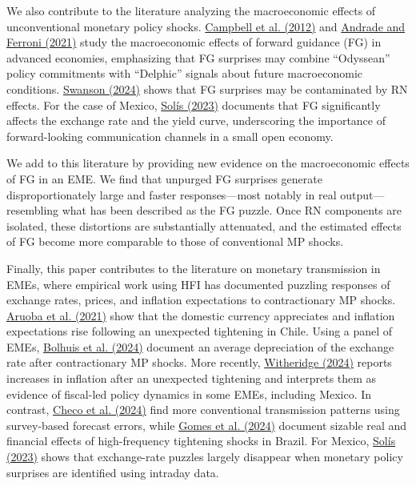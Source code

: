 \documentclass[12pt, reqno]{article}
\begin{document}
We also contribute to the literature analyzing the macroeconomic effects of unconventional monetary policy shocks. \hyperlink{Campbell et al. (2012)}{Campbell et al. (2012)} and \hyperlink{Andrade and Ferroni (2021)}{Andrade and Ferroni (2021)} study the macroeconomic effects of forward guidance (FG) in advanced economies, emphasizing that FG surprises may combine “Odyssean” policy commitments with “Delphic” signals about future macroeconomic conditions. \hyperlink{Swanson (2024)}{Swanson (2024)} shows that FG surprises may be contaminated by RN effects. For the case of Mexico, \hyperlink{Solís (2023)}{Solís (2023)} documents that FG significantly affects the exchange rate and the yield curve, underscoring the importance of forward-looking communication channels in a small open economy.

We add to this literature by providing new evidence on the macroeconomic effects of FG in an EME. We find that unpurged FG surprises generate disproportionately large and faster responses—most notably in real output—resembling what has been described as the FG puzzle. Once RN components are isolated, these distortions are substantially attenuated, and the estimated effects of FG become more comparable to those of conventional MP shocks.

Finally, this paper contributes to the literature on monetary transmission in EMEs, where empirical work using HFI has documented  puzzling responses of exchange rates, prices, and inflation expectations to contractionary MP shocks. \hyperlink{Aruoba et al. (2021)}{Aruoba et al. (2021)} show that the domestic currency appreciates and inflation expectations rise following an unexpected tightening in Chile. Using a panel of EMEs, \hyperlink{Bolhuis et al. (2024)}{Bolhuis et al. (2024)} document an average depreciation of the exchange rate after contractionary MP shocks. More recently, \hyperlink{Witheridge (2024)}{Witheridge (2024)} reports increases in inflation after an unexpected tightening and interprets them as evidence of fiscal-led policy dynamics in some EMEs, including Mexico. In contrast, \hyperlink{Checo et al. (2024)}{Checo et al. (2024)} find more conventional transmission patterns using survey-based forecast errors, while \hyperlink{Gomes et al. (2024)}{Gomes et al. (2024)} document sizable real and financial effects of high-frequency tightening shocks in Brazil. For Mexico, \hyperlink{Solís (2023)}{Solís (2023)} shows that exchange-rate puzzles largely disappear when monetary policy surprises are identified using intraday data.
\end{document}
